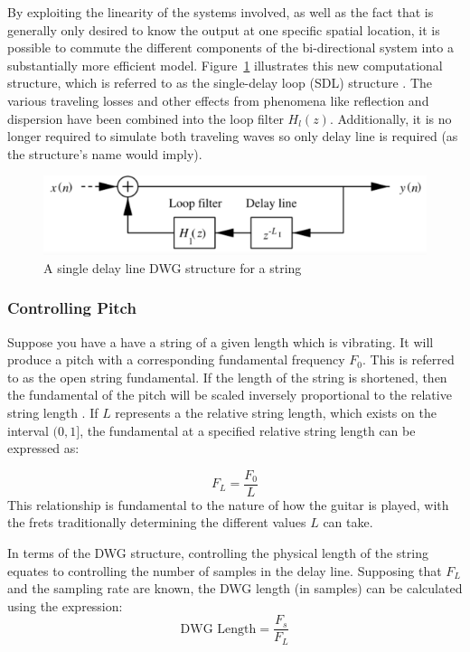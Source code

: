 \documentclass[main.tex]{subfiles}
\begin{document}
By exploiting the linearity of the systems involved, as well as the fact that is generally only desired to know the output at one specific spatial location, it is possible to commute the different components of the bi-directional system into a substantially more efficient model. Figure~\ref{fig:SDLModel} illustrates this new computational structure, which is referred to as the single-delay loop (SDL) structure . The various traveling losses and other effects from phenomena like reflection and dispersion have been combined into the loop filter $H_l(z)$. Additionally, it is no longer required to simulate both traveling waves so  only delay line is required (as the structure's name would imply).

\begin{figure}[h]
    \centering
    \includegraphics[scale=1]{./images/diagrams/SDLModel.png}
    \caption{A single delay line DWG structure for a string }
    \label{fig:SDLModel}
\end{figure}

\subsubsection{Controlling Pitch}
Suppose you have a have a string of a given length which is vibrating. It will produce a pitch with a corresponding fundamental frequency $F_0$. This is referred to as the open string fundamental. If the length of the string is shortened, then the fundamental of the pitch will be scaled inversely proportional to the relative string length . If $L$ represents a the relative string length, which exists on the interval $(0, 1]$, the fundamental at a specified relative string length can be expressed as:

\begin{equation}
    F_L = \frac{F_0}{L}
    \label{eq:F_L}
\end{equation}
This relationship is fundamental to the nature of how the guitar is played, with the frets traditionally determining the different values $L$ can take.

In terms of the DWG structure, controlling the physical length of the string equates to controlling the number of samples in the delay line. Supposing that $F_L$ and the sampling rate are known, the DWG length (in samples) can be calculated using the expression:
\begin{equation}
    \text{DWG Length} = \frac{F_s}{F_L}
\end{equation}
\end{document}
